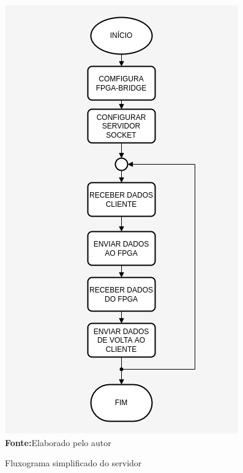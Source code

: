 \begin{figure}[ht]
	\caption{Fluxograma simplificado do servidor}
	\begin{center}
		\includegraphics[scale=0.47]{imagens/fluxogramaServidor.png}\\
		{\small \textbf{Fonte:}Elaborado pelo autor}
    \end{center}\label{fig:fluxoServidor}
\end{figure} 
